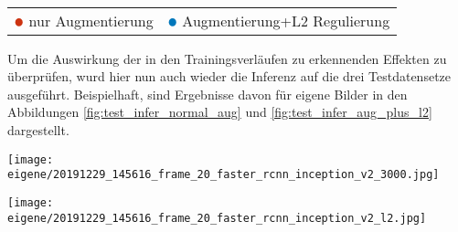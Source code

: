 \vspace{1cm}
\begin{minipage}{0.5\textwidth}
  \centering
  \def\svgwidth{0.9\textwidth}
  
  \label{plot:aug_l2_mAP}
\end{minipage}
\begin{minipage}{0.5\textwidth}
  \centering
  \def\svgwidth{0.9\textwidth}
  
  \label{plot:aug_l2_total_loss}
\end{minipage}
\\[1cm]
\begin{minipage}{0.5\textwidth}
  \centering
  \def\svgwidth{0.9\textwidth}
  
  \label{plot:aug_l2_classifier_loss}
\end{minipage}
\begin{minipage}{0.5\textwidth}
  \centering
  \def\svgwidth{0.9\textwidth}
  
  \label{plot:aug_l2_rpn_loss}
\end{minipage}
\begin{table}[htb]
  \centering
  \begin{tabular}{m{}<{\centering}m{}<{\centering}}
    $\color[HTML]{CC3311}\medbullet$  nur Augmentierung & $\color[HTML]{0077BB}\medbullet$  Augmentierung+L2 Regulierung
  \end{tabular}    
\end{table}

\vspace{1cm}

Um die Auswirkung der in den Trainingsverläufen 
zu erkennenden Effekten zu überprüfen, wurd hier 
nun auch wieder die Inferenz auf die drei Testdatensetze 
ausgeführt.
Beispielhaft, sind Ergebnisse davon für eigene Bilder 
in den Abbildungen \ref{fig:test_infer_normal_aug}
und \ref{fig:test_infer_aug_plus_l2} dargestellt.


\vspace{1cm}
\begin{minipage}{0.5\textwidth}
  \centering
  \texttt{[image: eigene/20191229\_145616\_frame\_20\_faster\_rcnn\_inception\_v2\_3000.jpg]}
  \label{fig:test_infer_normal_aug}
\end{minipage}
\begin{minipage}{0.5\textwidth}
  \centering
  \texttt{[image: eigene/20191229\_145616\_frame\_20\_faster\_rcnn\_inception\_v2\_l2.jpg]}
  \label{fig:test_infer_aug_plus_l2}
\end{minipage}
\vspace{1cm}

